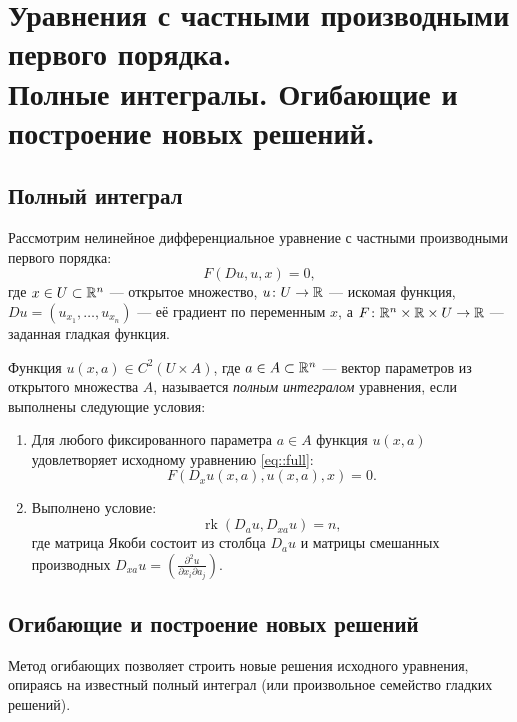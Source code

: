 \section{Уравнения с частными производными первого порядка.\\
Полные интегралы. Огибающие и построение новых решений.}
\label{sec:Chapter4} 

\subsection{Полный интеграл}
Рассмотрим нелинейное дифференциальное уравнение с частными производными первого порядка:
\begin{equation} \label{eq::full}
    F(Du, u, x) = 0,
\end{equation}
где $x \in U \subset \mathbb{R}^n$ --- открытое множество, $u \colon U \to \mathbb{R}$ --- искомая функция,
$Du = (u_{x_1}, \dots, u_{x_n})$ --- её градиент по переменным $x$, 
а $F \colon \mathbb{R}^n \times \mathbb{R} \times U \to \mathbb{R}$ --- заданная гладкая функция.

\begin{definition}
    Функция $u(x, a) \in C^2(U \times A)$, где $a \in A \subset \mathbb{R}^n$ --- вектор параметров из открытого множества $A$, 
    называется \textit{полным интегралом} уравнения, если выполнены следующие условия:
    \begin{enumerate}
        \item Для любого фиксированного параметра $a \in A$ функция $u(x, a)$ 
          удовлетворяет исходному уравнению \eqref{eq::full}:
        \begin{equation}
            F(D_x u(x, a), u(x, a), x) = 0.
        \end{equation}
        \item Выполнено условие:
        \begin{equation}
            \operatorname{rk} (D_a u, D_{xa} u) = n,
        \end{equation}
        где матрица Якоби состоит из столбца $D_a u$ и матрицы смешанных производных $D_{xa} u = \left( \frac{\partial^2 u}{\partial x_i \partial a_j} \right)$.
    \end{enumerate}
\end{definition}

\subsection{Огибающие и построение новых решений}
Метод огибающих позволяет строить новые решения исходного уравнения, опираясь на известный полный интеграл (или произвольное семейство гладких решений).

